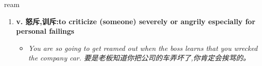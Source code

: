 
\begin{frame}
{\huge ream}
\begin{center}
\begin{enumerate}\Large
  \item \textbf{v. 怒斥,训斥:to criticize (someone) severely or angrily especially for personal failings}
  \begin{itemize}
    \item \em{\Large{You are so going to get reamed out when the boss learns that you wrecked the company car. 要是老板知道你把公司的车弄坏了,你肯定会挨骂的。}}
  \end{itemize}
\end{enumerate}
\end{center}
\end{frame}
